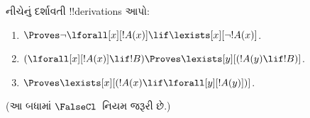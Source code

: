 \documentclass[../../../include/open-logic-section]{subfiles}
\begin{document}
\begin{prob}
નીચેનું દર્શાવતી !!{derivation}s આપો:
\begin{enumerate}
\item $\Proves \lnot\lforall[x][!A(x)] \lif \lexists[x][\lnot!A(x)]$.
\item $(\lforall[x][!A(x)] \lif !B) \Proves \lexists[y][(!A(y) \lif !B)]$.
\item $\Proves \lexists[x][(!A(x) \lif \lforall[y][!A(y)])]$.
\end{enumerate}
(આ બધામાં $\FalseCl$~નિયમ જરૂરી છે.)
\end{prob}
\end{document}
